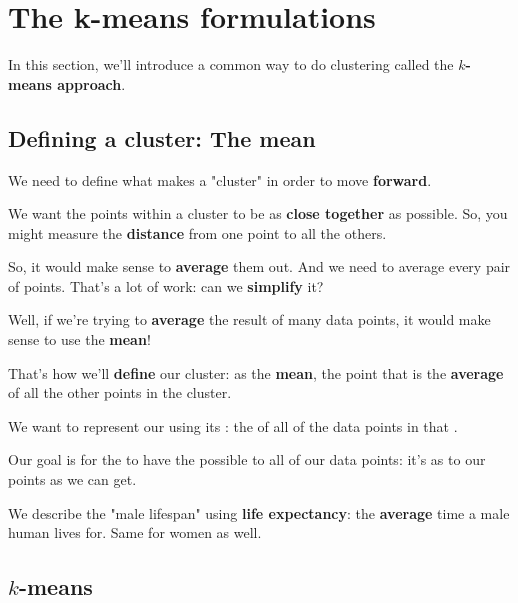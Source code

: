 
\section*{The k-means formulations}

    In this section, we'll introduce a common way to do clustering called the \textbf{$k$-means approach}.

    \subsection*{Defining a cluster: The mean}
        
        We need to define what makes a "cluster" in order to move \textbf{forward}.
        
        We want the points within a cluster to be as \textbf{close together} as possible. So, you might measure the \textbf{distance} from one point to all the others.
        
        So, it would make sense to \textbf{average} them out. And we need to average every pair of points. That's a lot of work: can we \textbf{simplify} it?
        
        Well, if we're trying to \textbf{average} the result of many data points, it would make sense to use the \textbf{mean}!
        
        That's how we'll \textbf{define} our cluster: as the \textbf{mean}, the point that is the \textbf{average} of all the other points in the cluster.\\
        
        \begin{definition}
            We want to represent our  using its : the  of all of the data points in that .
             
            Our goal is for the  to have the  possible to all of our data points: it's as  to our points as we can get.
        \end{definition}
        
        \miniex We describe the "male lifespan" using \textbf{life expectancy}: the \textbf{average} time a male human lives for. Same for women as well.
         
    \subsection*{$k$-means}
    
